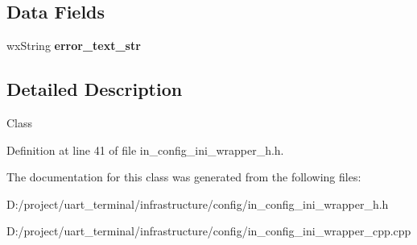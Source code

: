 \subsection*{Data Fields}
\begin{DoxyCompactItemize}
\item 
\mbox{\label{classconfig__ini_ade95748545cab9094e2db38f72d1d6c3}} 
wx\+String {\bfseries error\+\_\+text\+\_\+str}
\end{DoxyCompactItemize}


\subsection{Detailed Description}
Class 

Definition at line 41 of file in\+\_\+config\+\_\+ini\+\_\+wrapper\+\_\+h.\+h.



The documentation for this class was generated from the following files\+:\begin{DoxyCompactItemize}
\item 
D\+:/project/uart\+\_\+terminal/infrastructure/config/in\+\_\+config\+\_\+ini\+\_\+wrapper\+\_\+h.\+h\item 
D\+:/project/uart\+\_\+terminal/infrastructure/config/in\+\_\+config\+\_\+ini\+\_\+wrapper\+\_\+cpp.\+cpp\end{DoxyCompactItemize}
